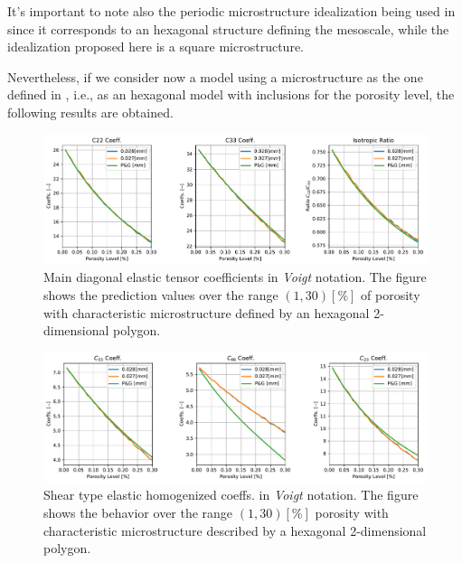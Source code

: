 \begin{rem}
It's important to note also the periodic microstructure idealization being used in \cite{Parnell2008} since it corresponds to an hexagonal structure defining the mesoscale, while the idealization proposed here is a square microstructure.
\end{rem}

Nevertheless, if we consider now a model using a microstructure as the one defined in \cite{Parnell2008}, i.e., as an hexagonal model with inclusions for the porosity level, the following results are obtained.

\begin{figure}[!h]
	\centering
	\includegraphics[scale=.5]{images/CellsProb/CellProb_MainHomCoeffsCircularHexa.pdf}
	\caption{Main diagonal elastic tensor coefficients in \textit{Voigt} notation. The figure shows the prediction values over the range $(1,30) [\%]$ of porosity with characteristic microstructure defined by an hexagonal 2-dimensional polygon.}
	\label{MainHomCoeffsHexagonal}
\end{figure}

\begin{figure}[!h]
	\centering
	\includegraphics[scale=.5]{images/CellsProb/CellProb_OthersHomCoeffsCircularHexa.pdf}
	\caption{Shear type elastic homogenized coeffs. in \textit{Voigt} notation. The figure shows the behavior over the range $(1,30) [\%]$ porosity with characteristic microstructure described by a hexagonal 2-dimensional polygon.}
	\label{OtherHomCoeffsHexagonal}
\end{figure}

